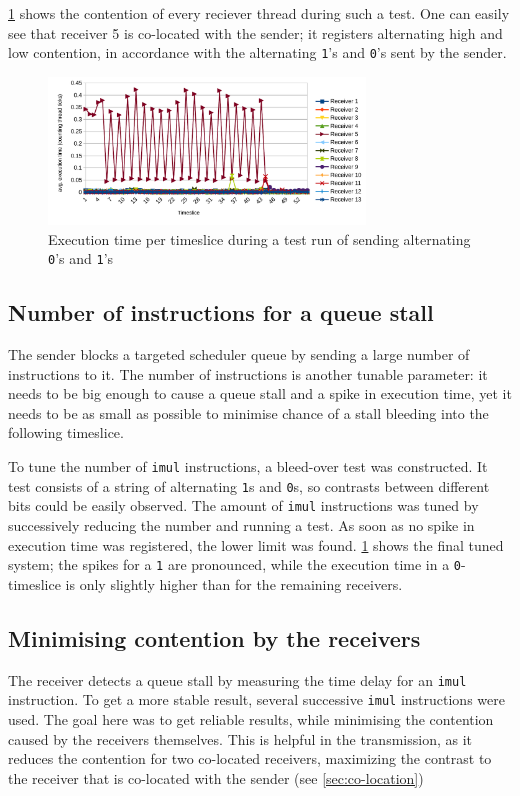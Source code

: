 \documentclass[11pt,
  titlepage=false,
]{scrreprt}
\begin{document}
\ref{fig:contentiontest} shows the contention of every reciever thread during such a test.
One can easily see that receiver 5 is co-located with the sender;
it registers alternating high and low contention, in accordance with the alternating \texttt{1}'s and \texttt{0}'s sent by the sender.

\begin{figure}
    \centering
    \includegraphics[width=0.75\textwidth]{figures/contentiontest}

    \caption{Execution time per timeslice during a test run of sending alternating \texttt{0}'s and \texttt{1}'s}
    \label{fig:contentiontest}
\end{figure}

\subsection{Number of instructions for a queue stall}
The sender blocks a targeted scheduler queue by sending a large number of instructions to it.
The number of instructions is another tunable parameter:
it needs to be big enough to cause a queue stall and a spike in execution time,
yet it needs to be as small as possible to minimise chance of a stall bleeding into the following timeslice.

To tune the number of \texttt{imul} instructions, a bleed-over test was constructed.
It test consists of a string of alternating \texttt{1}s and \texttt{0}s, so contrasts between different bits could be easily observed.
The amount of \texttt{imul} instructions was tuned by successively reducing the number and running a test.
As soon as no spike in execution time was registered, the lower limit was found.
\ref{fig:contentiontest} shows the final tuned system;
the spikes for a \texttt{1} are pronounced, while the execution time in a \texttt{0}-timeslice is only slightly higher than for the remaining receivers.

\subsection{Minimising contention by the receivers}
\label{sec:reducecontention}
The receiver detects a queue stall by measuring the time delay for an \texttt{imul} instruction.
To get a more stable result, several successive \texttt{imul} instructions were used.
The goal here was to get reliable results, while minimising the contention caused by the receivers themselves.
This is helpful in the transmission, as it reduces the contention for two co-located receivers,
maximizing the contrast to the receiver that is co-located with the sender (see \ref{sec:co-location})
\end{document}
